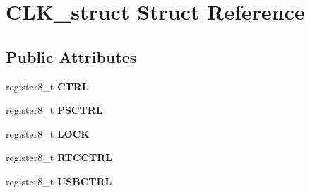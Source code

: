 \hypertarget{struct_c_l_k__struct}{}\section{C\+L\+K\+\_\+struct Struct Reference}
\label{struct_c_l_k__struct}
\subsection*{Public Attributes}
\begin{DoxyCompactItemize}
\item 
register8\+\_\+t {\bfseries C\+T\+RL}\hypertarget{struct_c_l_k__struct_a1efc0969ed96c40c37d9d5ba95ea76fc}{}\label{struct_c_l_k__struct_a1efc0969ed96c40c37d9d5ba95ea76fc}

\item 
register8\+\_\+t {\bfseries P\+S\+C\+T\+RL}\hypertarget{struct_c_l_k__struct_acda90be4a5b71ecd45629e9a77eda3d2}{}\label{struct_c_l_k__struct_acda90be4a5b71ecd45629e9a77eda3d2}

\item 
register8\+\_\+t {\bfseries L\+O\+CK}\hypertarget{struct_c_l_k__struct_a23eed8b6b36e9c64e9c87290a1dec8a9}{}\label{struct_c_l_k__struct_a23eed8b6b36e9c64e9c87290a1dec8a9}

\item 
register8\+\_\+t {\bfseries R\+T\+C\+C\+T\+RL}\hypertarget{struct_c_l_k__struct_ae9eb2eed0fea53cd31b84ff2e6ee6808}{}\label{struct_c_l_k__struct_ae9eb2eed0fea53cd31b84ff2e6ee6808}

\item 
register8\+\_\+t {\bfseries U\+S\+B\+C\+T\+RL}\hypertarget{struct_c_l_k__struct_acd6d71cd7930064945fe62d907a1b92e}{}\label{struct_c_l_k__struct_acd6d71cd7930064945fe62d907a1b92e}

\end{DoxyCompactItemize}


